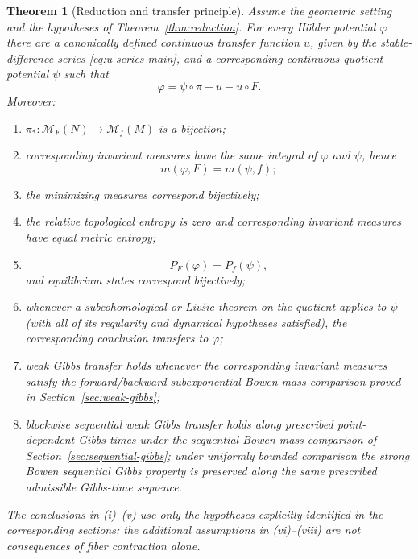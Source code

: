 \documentclass[11pt,a4paper]{article}
\newtheorem{theorem}{Theorem}[section]
\newcommand{\M}{\mathcal M}
\begin{document}
\begin{theorem}[Reduction and transfer principle]
\label{thm:master-reduction}
Assume the geometric setting and the hypotheses of Theorem~\ref{thm:reduction}.
For every H\"older potential $\varphi$ there are a canonically defined continuous
transfer function $u$, given by the stable-difference series
\eqref{eq:u-series-main}, and a corresponding continuous quotient potential
$\psi$ such that
\[
\varphi=\psi\circ\pi+u-u\circ F.
\]
Moreover:
\begin{enumerate}[label=\textnormal{(\roman*)}]
\item $\pi_*:\M_F(N)\to\M_f(M)$ is a bijection;
\item corresponding invariant measures have the same integral of
$\varphi$ and $\psi$, hence
\[
m(\varphi,F)=m(\psi,f);
\]
\item the minimizing measures correspond bijectively;
\item the relative topological entropy is zero and corresponding invariant
measures have equal metric entropy;
\item
\[
P_F(\varphi)=P_f(\psi),
\]
and equilibrium states correspond bijectively;
\item whenever a subcohomological or Liv\v{s}ic theorem on the quotient applies to
$\psi$ (with all of its regularity and dynamical hypotheses satisfied), the
corresponding conclusion transfers to $\varphi$;
\item weak Gibbs transfer holds whenever the corresponding invariant
measures satisfy the forward/backward subexponential Bowen-mass comparison
proved in Section~\ref{sec:weak-gibbs};
\item blockwise sequential weak Gibbs transfer holds along prescribed point-dependent Gibbs times under the sequential Bowen-mass comparison of
Section~\ref{sec:sequential-gibbs}; under uniformly bounded comparison the
strong Bowen sequential Gibbs property is preserved along the same prescribed admissible Gibbs-time sequence.
\end{enumerate}
The conclusions in (i)--(v) use only the hypotheses explicitly identified
in the corresponding sections; the additional assumptions in (vi)--(viii)
are not consequences of fiber contraction alone.
\end{theorem}
\end{document}
